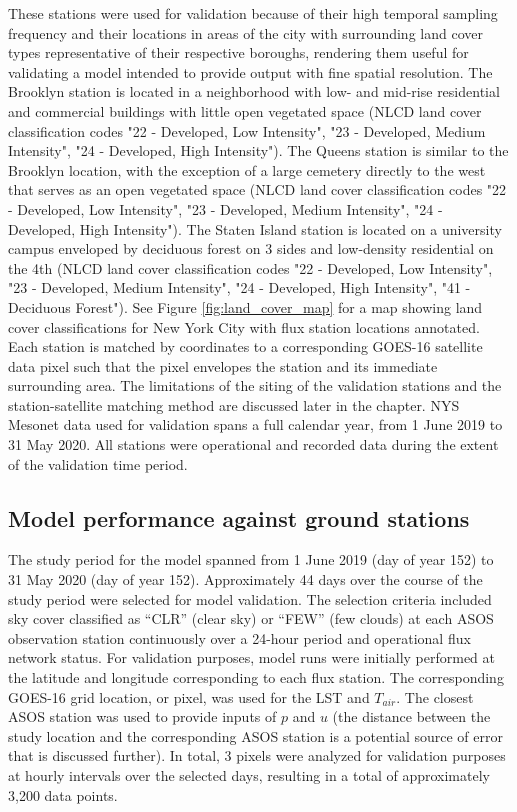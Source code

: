 These stations were used for validation because of their high temporal sampling frequency and their locations in areas of the city with surrounding land cover types representative of their respective boroughs, rendering them useful for validating a model intended to provide output with fine spatial resolution.  The Brooklyn station is located in a neighborhood with low- and mid-rise residential and commercial buildings with little open vegetated space (NLCD land cover classification codes "22 - Developed, Low Intensity", "23 - Developed, Medium Intensity", "24 - Developed, High Intensity"). The Queens station is similar to the Brooklyn location, with the exception of a large cemetery directly to the west that serves as an open vegetated space (NLCD land cover classification codes "22 - Developed, Low Intensity", "23 - Developed, Medium Intensity", "24 - Developed, High Intensity"). The Staten Island station is located on a university campus enveloped by deciduous forest on 3 sides and low-density residential on the 4th (NLCD land cover classification codes "22 - Developed, Low Intensity", "23 - Developed, Medium Intensity", "24 - Developed, High Intensity", "41 - Deciduous Forest"). See Figure \ref{fig:land_cover_map} for a map showing land cover classifications for New York City with flux station locations annotated. Each station is matched by coordinates to a corresponding GOES-16 satellite data pixel such that the pixel envelopes the station and its immediate surrounding area. The limitations of the siting of the validation stations and the station-satellite matching method are discussed later in the chapter. NYS Mesonet data used for validation spans a full calendar year, from 1 June 2019 to 31 May 2020. All stations were operational and recorded data during the extent of the validation time period. 

\subsection{Model performance against ground stations}
The study period for the model spanned from 1 June 2019 (day of year 152) to 31 May 2020 (day of year 152).  Approximately 44 days over the course of the study period were selected for model validation. The selection criteria included sky cover classified as “CLR” (clear sky) or “FEW” (few clouds) at each ASOS observation station continuously over a 24-hour period and operational flux network status. For validation purposes, model runs were initially performed at the latitude and longitude corresponding to each flux station. The corresponding GOES-16 grid location, or pixel, was used for the LST and $T_{air}$. The closest ASOS station was used to provide inputs of $p$ and $u$ (the distance between the study location and the corresponding ASOS station is a potential source of error that is discussed further). In total, 3 pixels were analyzed for validation purposes at hourly intervals over the selected days, resulting in a total of approximately 3,200 data points. 

